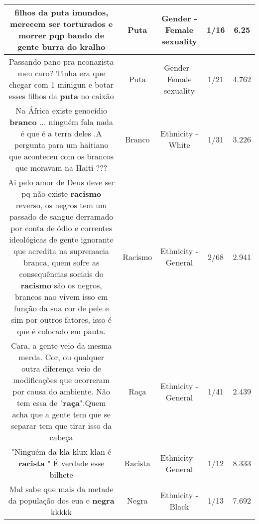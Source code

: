 \documentclass[11pt]{article}
\newlength\mylength
\begin{document}
\begin{center}
\begin{longtable}{|C{.65\mylength}|C{.30\mylength}|C{.12\mylength}|C{.12\mylength}|C{.12\mylength}|}
  \small filhos da \textbf{puta} imundos, merecem ser torturados e morrer pqp bando de gente burra do kralho\normalsize   & Puta & Gender - Female sexuality & 1/16 & 6.25 \\  \hline
  \small Passando pano pra neonazista meu caro? Tinha era que chegar com 1 minigun e botar esses filhos da \textbf{puta} no caixão\normalsize   & Puta & Gender - Female sexuality & 1/21 & 4.762 \\  \hline
  \small Na África existe genocídio \textbf{branco} ... ninguém fala nada é que é a terra deles .A pergunta para um haitiano que aconteceu com os brancos que moravam na Haiti ???\normalsize   & Branco & Ethnicity - White & 1/31 & 3.226 \\  \hline
  \small Ai pelo amor de Deus deve ser pq não existe \textbf{racismo} reverso, os negros tem um passado de sangue derramado por conta de ódio e correntes ideológicas de gente ignorante que acredita na supremacia branca, quem sofre as consequências sociais do \textbf{racismo} são os negros, brancos nao vivem isso em função da sua cor de pele e sim por outros fatores, isso é que é colocado em pauta.\normalsize   & Racismo & Ethnicity - General & 2/68 & 2.941 \\  \hline
  \small Cara, a gente veio da mesma merda. Cor, ou qualquer outra diferença veio de modificações que ocorreram por causa do ambiente. Não tem essa de "\textbf{raça}".Quem acha que a gente tem que se separar tem que tirar isso da cabeça\normalsize   & Raça & Ethnicity - General & 1/41 & 2.439 \\  \hline
  \small "Ninguém da kla klux klan é \textbf{racista} " É verdade esse bilhete\normalsize   & Racista & Ethnicity - General & 1/12 & 8.333 \\  \hline
  \small Mal sabe que mais da metade da população dos eua e \textbf{negra} kkkkk\normalsize   & Negra & Ethnicity - Black & 1/13 & 7.692 \\  \hline

\end{longtable}
\end{center}
\end{document}
